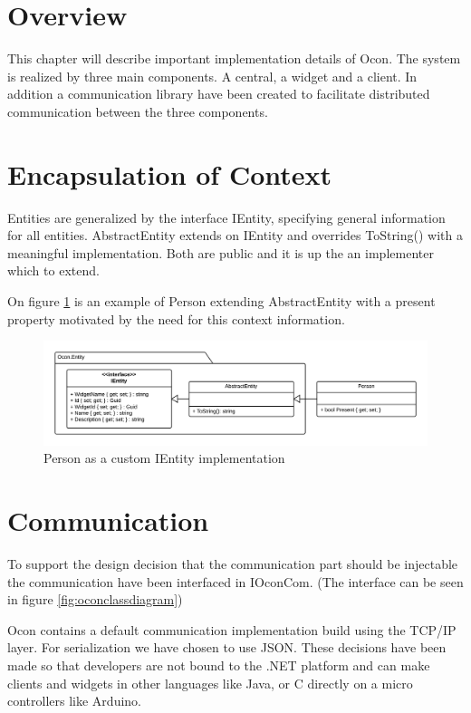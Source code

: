 \documentclass[../report.tex]{subfiles}
\begin{document}
\graphicspath{{img/}{../img/}}

\section{Overview}
This chapter will describe important implementation details of Ocon. The system is realized by three main components. A central, a widget and a client. In addition a communication library have been created to facilitate distributed communication between the three components.


\section{Encapsulation of Context}

Entities are generalized by the interface IEntity, specifying general information for all entities. AbstractEntity extends on IEntity and overrides ToString() with a meaningful implementation. Both are public and it is up the an implementer which to extend.

On figure \ref{fig:PersonImplementation} is an example of Person extending AbstractEntity with a present property motivated by the need for this context information.


\begin{figure}[H]
\includegraphics[width=\linewidth]{customEntityClass.png}
\caption{Person as a custom IEntity implementation}
\label{fig:PersonImplementation}
\end{figure}


\section{Communication}

To support the design decision that the communication part should be injectable the communication have been interfaced in IOconCom. (The interface can be seen in figure \ref{fig:oconclassdiagram})

Ocon contains a default communication implementation build using the TCP/IP layer. For serialization we have chosen to use JSON. These decisions have been made so that developers are not bound to the .NET platform and can make clients and widgets in other languages like Java, or C directly on a micro controllers like Arduino.
\end{document}
